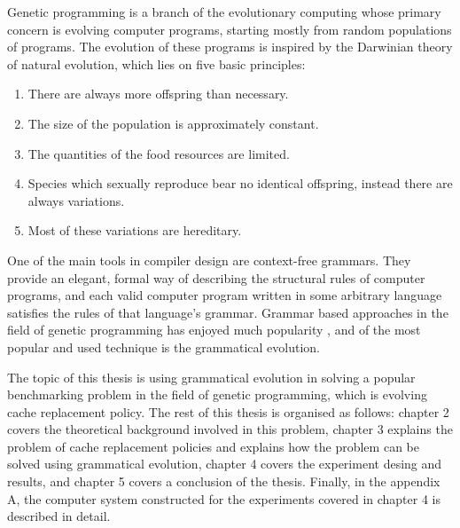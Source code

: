 Genetic programming is a branch of the evolutionary computing whose primary concern is evolving computer programs, starting mostly from random populations of programs. The evolution of these programs is inspired by the Darwinian theory of natural evolution, which lies on five basic principles\citep{cupic2019evolucijskoracunarstvo}:

\begin{enumerate}
	\item There are always more offspring than necessary.
	\item The size of the population is approximately constant.
	\item The quantities of the food resources are limited.
	\item Species which sexually reproduce bear no identical offspring, instead there are always variations.
	\item Most of these variations are hereditary.
\end{enumerate}

One of the main tools in compiler design are context-free grammars. They provide an elegant, formal way of describing the structural rules of computer programs, and each valid computer program written in some arbitrary language satisfies the rules of that language's grammar. Grammar based approaches in the field of genetic programming has enjoyed much popularity \citep{neill2003grammaticalevolution}, and of the most popular and used technique is the grammatical evolution.

The topic of this thesis is using grammatical evolution in solving a popular benchmarking problem in the field of genetic programming, which is evolving cache replacement policy. The rest of this thesis is organised as follows: chapter 2 covers the theoretical background involved in this problem, chapter 3 explains the problem of cache replacement policies and explains how the problem can be solved using grammatical evolution, chapter 4 covers the experiment desing and results, and chapter 5 covers a conclusion of the thesis. Finally, in the appendix A, the computer system constructed for the experiments covered in chapter 4 is described in detail.